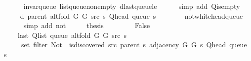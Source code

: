 \begin{isabellebody}
\ \ \ \ \isamarkupfalse%
\ invar{\isacharunderscore}{\kern0pt}queue\ list{\isacharunderscore}{\kern0pt}queue{\isacharunderscore}{\kern0pt}non{\isacharunderscore}{\kern0pt}empty\ d{\isacharunderscore}{\kern0pt}last{\isacharunderscore}{\kern0pt}queue{\isacharunderscore}{\kern0pt}le\isanewline
\ \ \ \ \isamarkupfalse%
\ {\isacharparenleft}{\kern0pt}simp\ add{\isacharcolon}{\kern0pt}\ Q{\isachardot}{\kern0pt}is{\isacharunderscore}{\kern0pt}empty{\isacharparenright}{\kern0pt}\isanewline
\ \ \isamarkupfalse%
\ \isamarkupfalse%
\ {\isachardoublequoteopen}{\isachardot}{\kern0pt}{\isachardot}{\kern0pt}{\isachardot}{\kern0pt}\ {\isacharequal}{\kern0pt}\ d\ {\isacharparenleft}{\kern0pt}parent\ {\isacharparenleft}{\kern0pt}alt{\isacharunderscore}{\kern0pt}fold\ G{}\ G{}\ src\ s{\isacharparenright}{\kern0pt}{\isacharparenright}{\kern0pt}\ {\isacharparenleft}{\kern0pt}Q{\isacharunderscore}{\kern0pt}head\ {\isacharparenleft}{\kern0pt}queue\ s{\isacharparenright}{\kern0pt}{\isacharparenright}{\kern0pt}\ {\isacharplus}{\kern0pt}\ {}{\isachardoublequoteclose}\isanewline
\ \ \ \ \isamarkupfalse%
\ not{\isacharunderscore}{\kern0pt}white{\isacharunderscore}{\kern0pt}head{\isacharunderscore}{\kern0pt}queue\isanewline
\ \ \ \ \isamarkupfalse%
\ {\isacharparenleft}{\kern0pt}simp\ add{\isacharcolon}{\kern0pt}\ not{\isacharunderscore}{\kern0pt}{\isacharparenleft}{\kern0pt}{}{\isacharparenright}{\kern0pt}{\isacharparenright}{\kern0pt}\isanewline
\ \ \isamarkupfalse%
\ \isamarkupfalse%
\ {\isacharquery}{\kern0pt}thesis\isanewline
\ \ \ \ \isacommand{{\isachardot}{\kern0pt}}\isamarkupfalse%
\isanewline
{}\isamarkupfalse%
\isanewline
\ \ \isamarkupfalse%
\ False\isanewline
\ \ \isamarkupfalse%
\isanewline
\ \ \ \ {\isachardoublequoteopen}last\ {\isacharparenleft}{\kern0pt}Q{\isacharunderscore}{\kern0pt}list\ {\isacharparenleft}{\kern0pt}queue\ {\isacharparenleft}{\kern0pt}alt{\isacharunderscore}{\kern0pt}fold\ G{}\ G{}\ src\ s{\isacharparenright}{\kern0pt}{\isacharparenright}{\kern0pt}{\isacharparenright}{\kern0pt}\ {\isasymin}\isanewline
\ \ \ \ \ set\ {\isacharparenleft}{\kern0pt}filter\ {\isacharparenleft}{\kern0pt}Not\ {\isasymcirc}\ is{\isacharunderscore}{\kern0pt}discovered\ src\ {\isacharparenleft}{\kern0pt}parent\ s{\isacharparenright}{\kern0pt}{\isacharparenright}{\kern0pt}\ {\isacharparenleft}{\kern0pt}adjacency\ G{}\ G{}\ s\ {\isacharparenleft}{\kern0pt}Q{\isacharunderscore}{\kern0pt}head\ {\isacharparenleft}{\kern0pt}queue\ s{\isacharparenright}{\kern0pt}{\isacharparenright}{\kern0pt}{\isacharparenright}{\kern0pt}{\isacharparenright}{\kern0pt}{\isachardoublequoteclose}\isanewline

\end{isabellebody}
